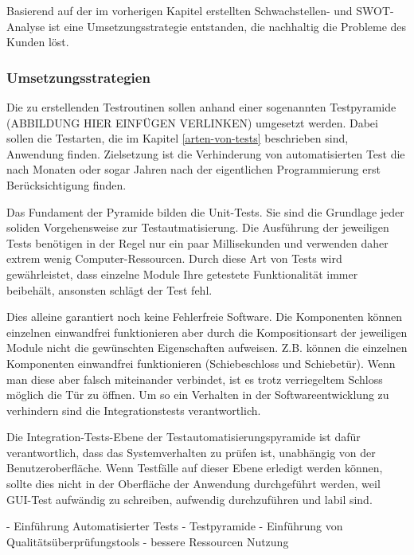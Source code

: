 Basierend auf der im vorherigen Kapitel erstellten Schwachstellen- und SWOT-Analyse ist eine Umsetzungsstrategie entstanden, die nachhaltig die Probleme des Kunden löst.

\subsubsection{Umsetzungsstrategien}
Die zu erstellenden Testroutinen sollen anhand einer sogenannten Testpyramide (ABBILDUNG HIER EINFÜGEN VERLINKEN) umgesetzt werden. Dabei sollen die Testarten, die im Kapitel \ref{arten-von-tests} beschrieben sind, Anwendung finden. Zielsetzung ist die Verhinderung von automatisierten Test die nach Monaten oder sogar Jahren nach der eigentlichen Programmierung erst Berücksichtigung finden.

Das Fundament der Pyramide bilden die Unit-Tests. Sie sind die Grundlage jeder soliden Vorgehensweise zur Testautmatisierung. Die Ausführung der jeweiligen Tests benötigen in der Regel nur ein paar Millisekunden und verwenden daher extrem wenig Computer-Ressourcen. Durch diese Art von Tests wird gewährleistet, dass einzelne Module Ihre getestete Funktionalität immer beibehält, ansonsten schlägt der Test fehl. 

Dies alleine garantiert noch keine Fehlerfreie Software. Die Komponenten können einzelnen einwandfrei funktionieren aber durch die Kompositionsart der jeweiligen Module nicht die gewünschten Eigenschaften aufweisen. Z.B. können die einzelnen Komponenten einwandfrei funktionieren (Schiebeschloss und Schiebetür). Wenn man diese aber falsch miteinander verbindet, ist es trotz verriegeltem Schloss möglich die Tür zu öffnen. Um so ein Verhalten in der Softwareentwicklung zu verhindern sind die Integrationstests verantwortlich. 

Die Integration-Tests-Ebene der Testautomatisierungspyramide ist dafür verantwortlich, dass das
Systemverhalten zu prüfen ist, unabhängig von der Benutzeroberfläche. Wenn Testfälle auf dieser
Ebene erledigt werden können, sollte dies nicht in der Oberfläche der Anwendung durchgeführt
werden, weil  GUI-Test aufwändig zu schreiben, aufwendig durchzuführen und labil sind. 

- Einführung Automatisierter Tests
- Testpyramide
- Einführung von Qualitätsüberprüfungstools 
- bessere Ressourcen Nutzung

